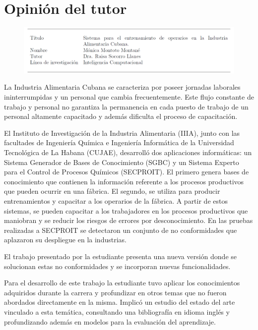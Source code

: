 \chapter*{Opinión del tutor}

\begin{figure}[H]
 \includegraphics[width=1\linewidth]{imagen/opinion.png}
\end{figure}

La Industria Alimentaria Cubana se caracteriza por poseer jornadas laborales ininterrumpidas y un personal que cambia frecuentemente. Este flujo constante de trabajo y personal no garantiza la permanencia en cada puesto de trabajo de un personal altamente capacitado y además dificulta el proceso de capacitación.

El Instituto de Investigación de la Industria Alimentaria (IIIA), junto con las facultades de Ingeniería Química e Ingeniería Informática de la Universidad Tecnológica de La Habana (CUJAE), desarrolló dos aplicaciones informáticas: un Sistema Generador de Bases de Conocimiento (SGBC) y un Sistema Experto para el Control de Procesos Químicos (SECPROIT).
El primero genera bases de conocimiento que contienen la información referente a los procesos productivos que pueden ocurrir en una fábrica. El segundo, se utiliza para producir entrenamientos y capacitar a los operarios de la fábrica. A partir de estos sistemas, se pueden capacitar a los trabajadores en los procesos productivos que maniobran y se reducir los riesgos de errores por desconocimiento. En las pruebas realizadas a SECPROIT se detectaron un conjunto de no conformidades que aplazaron su despliegue en la industrias.

El trabajo presentado por la estudiante presenta una nueva versión donde se solucionan estas no conformidades y se incorporan nuevas funcionalidades.

Para el desarrollo de este trabajo la estudiante tuvo aplicar los conocimientos adquiridos durante la carrera y profundizar en otros temas que no fueron abordados directamente en la misma. Implicó un estudio del estado del arte vinculado a esta temática, consultando una bibliografía en idioma inglés y profundizando además en modelos para la evaluación del aprendizaje.

